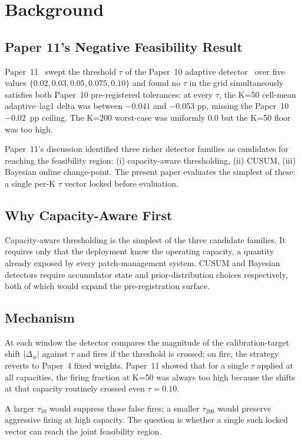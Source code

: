 \section{Background}

\subsection{Paper 11's Negative Feasibility Result}

Paper~11~\cite{paper11tau} swept the threshold $\tau$ of the Paper~10
adaptive detector~\cite{paper10adaptive} over five values
$\{0.02, 0.03, 0.05, 0.075, 0.10\}$ and found no $\tau$ in the grid
simultaneously satisfies both Paper~10 pre-registered tolerances: at
every $\tau$, the K=50 cell-mean adaptive--lag1 delta was between
$-0.041$ and $-0.053$ pp, missing the Paper~10 $-0.02$~pp ceiling.
The K=200 worst-case was uniformly $0.0$ but the K=50 floor was
too high.

Paper~11's discussion identified three richer detector families as
candidates for reaching the feasibility region: (i) capacity-aware
thresholding, (ii) CUSUM, (iii) Bayesian online change-point. The
present paper evaluates the simplest of these: a single per-K $\tau$
vector locked before evaluation.

\subsection{Why Capacity-Aware First}

Capacity-aware thresholding is the simplest of the three candidate
families. It requires only that the deployment know the operating
capacity, a quantity already exposed by every patch-management
system. CUSUM and Bayesian detectors require accumulator state and
prior-distribution choices respectively, both of which would expand
the pre-registration surface.

\subsection{Mechanism}

At each window the detector compares the magnitude of the
calibration-target shift $|\Delta_w|$ against $\tau$ and fires if
the threshold is crossed; on fire, the strategy reverts to Paper~4
fixed weights. Paper~11 showed that for a single $\tau$ applied at
all capacities, the firing fraction at K=50 was always too high
because the shifts at that capacity routinely crossed even
$\tau = 0.10$.

A larger $\tau_{50}$ would suppress those false fires; a smaller
$\tau_{200}$ would preserve aggressive firing at high capacity. The
question is whether a single such locked vector can reach the joint
feasibility region.
